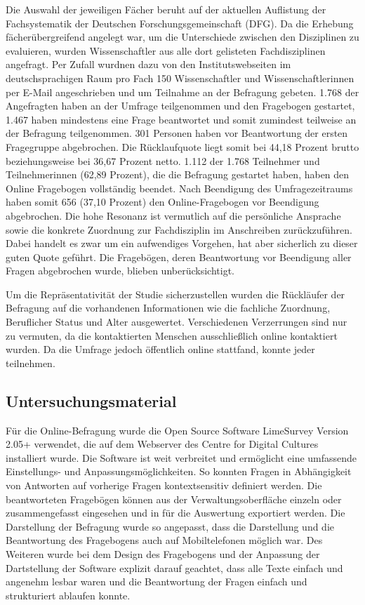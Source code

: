 Die Auswahl der jeweiligen Fächer beruht auf der aktuellen Auflistung der Fachsystematik der Deutschen Forschungsgemeinschaft (DFG). Da die Erhebung fächerübergreifend angelegt war, um die Unterschiede zwischen den Disziplinen zu evaluieren, wurden Wissenschaftler aus alle dort gelisteten Fachdisziplinen angefragt. Per Zufall wurdnen dazu von den Institutswebseiten im deutschsprachigen Raum pro Fach 150 Wissenschaftler und Wissenschaftlerinnen per E-Mail angeschrieben und um Teilnahme an der Befragung gebeten. 1.768 der Angefragten haben an der Umfrage teilgenommen und den Fragebogen gestartet, 1.467 haben mindestens eine Frage beantwortet und somit zumindest teilweise an der Befragung teilgenommen. 301 Personen haben vor Beantwortung der ersten Fragegruppe abgebrochen. Die Rücklaufquote liegt somit bei 44,18 Prozent brutto beziehungsweise bei 36,67 Prozent netto. 1.112 der 1.768 Teilnehmer und Teilnehmerinnen (62,89 Prozent), die die Befragung gestartet haben, haben den Online Fragebogen vollständig beendet. Nach Beendigung des Umfragezeitraums haben somit 656 (37,10 Prozent) den Online-Fragebogen vor Beendigung abgebrochen. Die hohe Resonanz ist vermutlich auf die persönliche Ansprache sowie die konkrete Zuordnung zur Fachdisziplin im Anschreiben zurückzuführen. Dabei handelt es zwar um ein aufwendiges Vorgehen, hat aber sicherlich zu dieser guten Quote geführt. Die Fragebögen, deren Beantwortung vor Beendigung aller Fragen abgebrochen wurde, blieben unberücksichtigt.

Um die Repräsentativität der Studie sicherzustellen wurden die Rückläufer der Befragung auf die vorhandenen Informationen wie die fachliche Zuordnung, Beruflicher Status und Alter ausgewertet. Verschiedenen Verzerrungen sind nur zu vermuten, da die kontaktierten Menschen ausschließlich online kontaktiert wurden. Da die Umfrage jedoch öffentlich online stattfand, konnte jeder teilnehmen.

\subsection{Untersuchungsmaterial}

Für die Online-Befragung wurde die Open Source Software LimeSurvey Version 2.05+ verwendet, die auf dem Webserver des Centre for Digital Cultures installiert wurde. Die Software ist weit verbreitet und ermöglicht eine umfassende Einstellungs- und Anpassungsmöglichkeiten. So konnten Fragen in Abhängigkeit von Antworten auf vorherige Fragen kontextsensitiv definiert werden. Die beantworteten Fragebögen können aus der Verwaltungsoberfläche einzeln oder zusammengefasst eingesehen und in für die Auswertung exportiert werden. Die Darstellung der Befragung wurde so angepasst, dass die Darstellung und die Beantwortung des Fragebogens auch auf Mobiltelefonen möglich war. Des Weiteren wurde bei dem Design des Fragebogens und der Anpassung der Dartstellung der Software explizit darauf geachtet, dass alle Texte einfach und angenehm lesbar waren und die Beantwortung der Fragen einfach und strukturiert ablaufen konnte.

